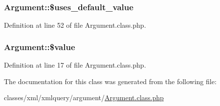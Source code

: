 \subsubsection[{\texorpdfstring{\$uses\+\_\+default\+\_\+value}{$uses_default_value}}]{\setlength{\rightskip}{0pt plus 5cm}Argument\+::\$uses\+\_\+default\+\_\+value}\hypertarget{classArgument_a3f8f20477043da002ba9d48ede482baf}{}\label{classArgument_a3f8f20477043da002ba9d48ede482baf}


Definition at line 52 of file Argument.\+class.\+php.

\subsubsection[{\texorpdfstring{\$value}{$value}}]{\setlength{\rightskip}{0pt plus 5cm}Argument\+::\$value}\hypertarget{classArgument_a762eb8881d615f61189bba09b9bd7300}{}\label{classArgument_a762eb8881d615f61189bba09b9bd7300}


Definition at line 17 of file Argument.\+class.\+php.



The documentation for this class was generated from the following file\+:\begin{DoxyCompactItemize}
\item 
classes/xml/xmlquery/argument/\hyperlink{Argument_8class_8php}{Argument.\+class.\+php}\end{DoxyCompactItemize}

